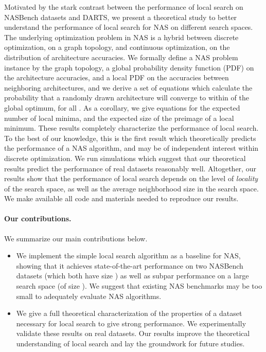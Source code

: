 \documentclass[11pt]{article}
\numberwithin{equation}{section}
\numberwithin{figure}{section}
\theoremstyle{plain}
\theoremstyle{definition}
\begin{document}
Motivated by the stark contrast between the performance of local search
on NASBench datasets and DARTS, we present a theoretical study
to better understand the performance of local search for NAS on different search spaces.
The underlying optimization problem in NAS is a hybrid between discrete
optimization, on a graph topology, and continuous optimization, on the
distribution of architecture accuracies.
We formally define a NAS problem instance by the graph topology, 
a global probability density function (PDF) on the architecture accuracies, 
and a local PDF on the accuracies between neighboring architectures, 
and we derive a set of equations which
calculate the probability that a randomly drawn architecture will converge to within 
of the global optimum, for all .
As a corollary, we give equations for the expected number of local minima,
and the expected size of the preimage of a local minimum.
These results completely characterize the performance of local search.
To the best of our knowledge, this is the first result which theoretically predicts the
performance of a NAS algorithm, and may be of independent interest within discrete optimization.
We run simulations which suggest that our theoretical results predict the performance
of real datasets reasonably well.
Altogether, our results show that the performance 
of local search depends on the level of \emph{locality} of the search space, 
as well as the average neighborhood size in the search space.
We make available all code and materials needed to reproduce our results.


\paragraph{Our contributions.} We summarize our main contributions below.
\begin{itemize} [topsep=0pt, itemsep=2pt, parsep=0pt, leftmargin=5mm]
    \item We implement the simple local search algorithm as a baseline
    for NAS, showing that it achieves state-of-the-art performance on two
    NASBench datasets (which both have size ) as well as subpar performance on a large search
    space (of size ). We suggest that existing NAS benchmarks may be too small to
    adequately evaluate NAS algorithms.
    \item We give a full theoretical characterization of the properties of a dataset 
    necessary for local search to give strong performance. 
    We experimentally validate these results on real datasets.
Our results improve the theoretical understanding of local search and
    lay the groundwork for future studies.
    \end{itemize}
\end{document}
